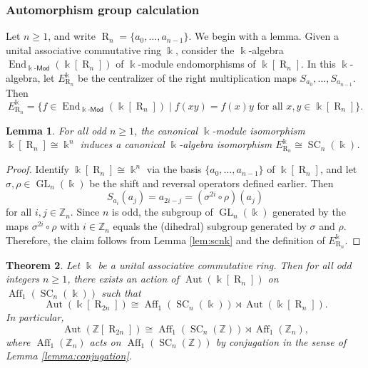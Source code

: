 \documentclass[12 pt]{amsart}
\newtheorem{theorem}{Theorem}[section]
\newtheorem{lemma}[theorem]{Lemma}
\theoremstyle{definition}
\theoremstyle{remark}
\numberwithin{equation}{section}
\newcommand{\Aut}{\operatorname{Aut}}
\newcommand{\R}{\operatorname{R}}
\newcommand{\GL}{\operatorname{GL}}
\newcommand{\Aff}{\operatorname{Aff}}
\newcommand{\SC}{\operatorname{SC}}
\newcommand{\Z}{\mathbb{Z}}
\renewcommand{\k}{\Bbbk}
\begin{document}
\subsubsection{Automorphism group calculation} 
Let $n\geq 1$, and write $\R_n=\{a_0,\dots,a_{n-1}\}$. We begin with a lemma. Given a unital associative commutative ring $\k$, consider the $\k$-algebra $\operatorname{End}_{\k\text{-}\mathsf{Mod}}(\k[\R_n])$ of $\k$-module endomorphisms of $\k[\R_n]$. In this $\k$-algebra, let $E^\k_{\R_n}$ be the centralizer of the right multiplication maps $S_{a_0},\dots,S_{a_{n-1}}$. Then
\begin{equation}\label{eq:ekrn}
    E^\k_{\R_n}=\{f\in\operatorname{End}_{\k\text{-}\mathsf{Mod}}(\k[\R_n])\mid f(xy)=f(x)y\text{ for all }x,y\in\k[\R_n]\}.
\end{equation}

\begin{lemma}\label{lemma:ern}
    For all odd $n\geq 1$, the canonical $\k$-module isomorphism $\k[\R_n]\cong\k^n$ induces a canonical $\k$-algebra isomorphism $E^\k_{\R_n}\cong \SC_n(\k)$.
\end{lemma}

\begin{proof}
    Identify $\k[\R_n]\cong\k^n$ via the basis $\{a_0,\dots,a_{n-1}\}$ of $\k[\R_n]$, and let $\sigma,\rho\in\GL_n(\k)$ be the shift and reversal operators defined earlier. Then
    \[
    S_{a_i}(a_j)=a_{2i-j}=(\sigma^{2i}\circ\rho)(a_j)
    \]
    for all $i,j\in\Z_n$. Since $n$ is odd, the subgroup of $\GL_n(\k)$ generated by the maps $\sigma^{2i}\circ\rho$ with $i\in\Z_n$ equals the (dihedral) subgroup generated by $\sigma$ and $\rho$. 
    Therefore, the claim follows from Lemma \ref{lem:scnk} and the definition of $E^\k_{\R_n}$.
\end{proof}

\begin{theorem}\label{thm:r2n}
    Let $\k$ be a unital associative commutative ring. Then for all odd integers $n\geq 1$, 
    there exists an action of $\Aut(\k[\R_n])$ on $\Aff_1(\SC_n(\k))$ such that
    \[
    \Aut(\k[\R_{2n}])\cong \Aff_1(\SC_n(\k))\rtimes \Aut(\k[\R_n]).
    \]
    In particular, 
\[
\Aut(\Z[\R_{2n}])\cong \Aff_1(\SC_n(\Z))\rtimes \Aff_1(\Z_n),
\]
where $\Aff_1(\Z_n)$ acts on $\Aff_1(\SC_n(\Z))$ by conjugation in the sense of Lemma \ref{lemma:conjugation}.
\end{theorem}
\end{document}
